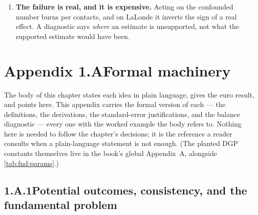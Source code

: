 \begin{enumerate}[leftmargin=*, itemsep=.45em]
  \item \textbf{The failure is real, and it is expensive.} Acting on the confounded number burns
        \eur{\nbZeroPolBurn} per \nbZeroNCustomers{} contacts, and on LaLonde it inverts the sign
        of a real effect. A diagnostic says \emph{where} an estimate is unsupported, not what the
        supported estimate would have been.
\end{enumerate}


\clearpage
\section*{Appendix 1.A\quad Formal machinery}
\label{app:fnd}

The body of this chapter states each idea in plain language, gives the euro result, and points
here. This appendix carries the formal version of each --- the definitions, the derivations, the
standard-error justifications, and the balance diagnostic --- every one with the worked example
the body refers to. Nothing here is needed to follow the chapter's decisions; it is the reference
a reader consults when a plain-language statement is not enough. (The planted DGP constants
themselves live in the book's global Appendix~A, alongside \cref{tab:fnd:params}.)

\subsection*{1.A.1\quad Potential outcomes, consistency, and the fundamental problem}

